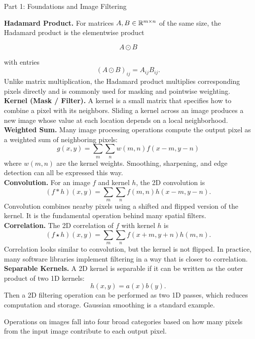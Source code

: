 \documentclass[letterpaper]{article}
\begin{document}
\begin{notes}{Part 1: Foundations and Image Filtering}

\textbf{Hadamard Product.} For matrices $A,B\in\mathbb{R}^{m\times n}$ of the same size, the Hadamard product is the elementwise product

$$A \odot B$$

with entries
$$
(A\odot B)_{ij} = A_{ij}B_{ij}.
$$
Unlike matrix multiplication, the Hadamard product multiplies corresponding pixels directly and is commonly used for masking and pointwise weighting.\\

\textbf{Kernel (Mask / Filter).} A kernel is a small matrix that specifies how to combine a pixel with its neighbors. Sliding a kernel across an image produces a new image whose value at each location depends on a local neighborhood.\\

\textbf{Weighted Sum.} Many image processing operations compute the output pixel as a weighted sum of neighboring pixels:
$$
g(x,y) = \sum_m \sum_n w(m,n)f(x-m,y-n)
$$
where $w(m,n)$ are the kernel weights. Smoothing, sharpening, and edge detection can all be expressed this way.\\

\textbf{Convolution.} For an image $f$ and kernel $h$, the 2D convolution is
$$
(f*h)(x,y) = \sum_m \sum_n f(m,n)h(x-m, y-n).
$$
Convolution combines nearby pixels using a shifted and flipped version of the kernel. It is the fundamental operation behind many spatial filters.\\

\textbf{Correlation.} The 2D correlation of $f$ with kernel $h$ is
$$
(f\star h)(x,y) = \sum_m \sum_n f(x+m, y+n)h(m,n).
$$
Correlation looks similar to convolution, but the kernel is not flipped. In practice, many software libraries implement filtering in a way that is closer to correlation.\\

\textbf{Separable Kernels.} A 2D kernel is separable if it can be written as the outer product of two 1D kernels:
$$
h(x,y)=a(x)b(y).
$$
Then a 2D filtering operation can be performed as two 1D passes, which reduces computation and storage. Gaussian smoothing is a standard example.



Operations on images fall into four broad categories based on how many pixels from the input image contribute to each output pixel.


\end{notes}
\end{document}
